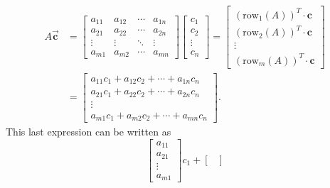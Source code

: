 \documentclass{report}
\begin{document}
\begin{itemize}
                \bigbreak \noindent 
                \begin{align*}
                    A\vec{\mathbf{c}}&= \begin{bmatrix}
                    a_{11} & a_{12} & \cdots & a_{1n} \\
                    a_{21} & a_{22} & \cdots & a_{2n} \\
                    \vdots & \vdots & \ddots & \vdots \\
                    a_{m1} & a_{m2} & \cdots & a_{mn}
                \end{bmatrix}
                \begin{bmatrix}
                    c_1 \\
                    c_2 \\
                    \vdots \\
                    c_n
                \end{bmatrix}
                = 
                \begin{bmatrix}
                    (\text{row}_1(A))^T \cdot \mathbf{c} \\
                    (\text{row}_2(A))^T \cdot \mathbf{c} \\
                    \vdots \\
                    (\text{row}_m(A))^T \cdot \mathbf{c} 
                \end{bmatrix} \\
                &=\begin{bmatrix}
                    a_{11}c_1 + a_{12}c_2 + \cdots + a_{1n}c_n \\
                    a_{21}c_1 + a_{22}c_2 + \cdots + a_{2n}c_n \\
                    \vdots \\
                    a_{m1}c_1 + a_{m2}c_2 + \cdots + a_{mn}c_n
                \end{bmatrix}
            .\end{align*}
            This last expression can be written as
            \[
                \begin{bmatrix}
                    a_{11} \\
                    a_{21} \\
                    \vdots \\
                    a_{m1}
                \end{bmatrix}
                c_1
                +
                \begin{bmatrix}

\end{bmatrix}\]
\end{itemize}
\end{document}
